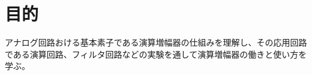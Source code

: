\documentclass[../../../main]{subfiles}
\begin{document}
\section{目的}
アナログ回路おける基本素子である演算増幅器の仕組みを理解し、その応用回路である演算回路、フィルタ回路などの実験を通して演算増幅器の働きと使い方を学ぶ。
\end{document}
